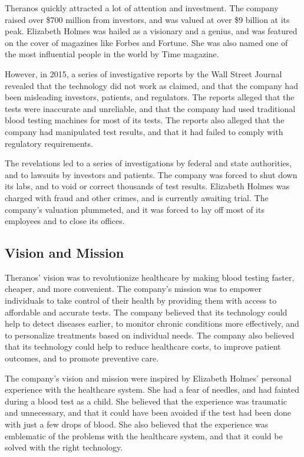 \documentclass[stu]{apa7}
\begin{document}
\begin{multicols}{2}
    Theranos quickly attracted a lot of attention and investment. The company
    raised over \$700 million from investors, and was valued at over \$9 billion
    at its peak. Elizabeth Holmes was hailed as a visionary and a genius, and was
    featured on the cover of magazines like Forbes and Fortune. She was also
    named one of the most influential people in the world by Time magazine. \textcite{forbes}

    However, in 2015, a series of investigative reports by the Wall Street
    Journal revealed that the technology did not work as claimed, and that the
    company had been misleading investors, patients, and regulators. The reports
    alleged that the tests were inaccurate and unreliable, and that the company
    had used traditional blood testing machines for most of its tests. The
    reports also alleged that the company had manipulated test results, and that
    it had failed to comply with regulatory requirements. \cite{wsj}

    The revelations led to a series of investigations by federal and state
    authorities, and to lawsuits by investors and patients. The company was
    forced to shut down its labs, and to void or correct thousands of test
    results. Elizabeth Holmes was charged with fraud and other crimes, and is
    currently awaiting trial. The company's valuation plummeted, and it was
    forced to lay off most of its employees and to close its offices. \cite{nyt}

    \subsection{Vision and Mission}

    Theranos' vision was to revolutionize healthcare by making blood testing
    faster, cheaper, and more convenient. The company's mission was to empower
    individuals to take control of their health by providing them with access to
    affordable and accurate tests. The company believed that its technology
    could help to detect diseases earlier, to monitor chronic conditions more
    effectively, and to personalize treatments based on individual needs. The
    company also believed that its technology could help to reduce healthcare
    costs, to improve patient outcomes, and to promote preventive care. \cite{theranos}

    The company's vision and mission were inspired by Elizabeth Holmes' personal
    experience with the healthcare system. She had a fear of needles, and had
    fainted during a blood test as a child. She believed that the experience was
    traumatic and unnecessary, and that it could have been avoided if the test
    had been done with just a few drops of blood. She also believed that the
    experience was emblematic of the problems with the healthcare system, and
    that it could be solved with the right technology. \cite{holmes}


\end{multicols}
\end{document}
